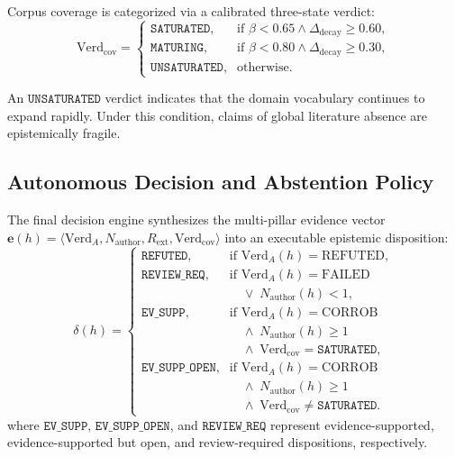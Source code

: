 \documentclass[conference,10pt]{IEEEtran}
\begin{document}
Corpus coverage is categorized via a calibrated three-state verdict:
\begin{equation}
\mathrm{Verd}_{\text{cov}} = \begin{cases}
\texttt{SATURATED}, & \text{if } \beta < 0.65 \land \Delta_{\text{decay}} \ge 0.60, \\
\texttt{MATURING},  & \text{if } \beta < 0.80 \land \Delta_{\text{decay}} \ge 0.30, \\
\texttt{UNSATURATED},& \text{otherwise}.
\end{cases}
\end{equation}

An $\texttt{UNSATURATED}$ verdict indicates that the domain vocabulary continues to expand rapidly. Under this condition, claims of global literature absence are epistemically fragile.

\subsection{Autonomous Decision and Abstention Policy}
The final decision engine synthesizes the multi-pillar evidence vector $\mathbf{e}(h) = \langle \mathrm{Verd}_A, N_{\text{author}}, R_{\text{ext}}, \mathrm{Verd}_{\text{cov}} \rangle$ into an executable epistemic disposition:
\begin{equation}
\delta(h) = \begin{cases}
\texttt{REFUTED}, & \text{if } \mathrm{Verd}_A(h) = \mathrm{REFUTED}, \\
\texttt{REVIEW\_REQ}, & \text{if } \mathrm{Verd}_A(h) = \mathrm{FAILED} \\
                      & \quad \lor \; N_{\text{author}}(h) < 1, \\
\texttt{EV\_SUPP},    & \text{if } \mathrm{Verd}_A(h) = \mathrm{CORROB} \\
                      & \quad \land \; N_{\text{author}}(h) \ge 1 \\
                      & \quad \land \; \mathrm{Verd}_{\text{cov}} = \texttt{SATURATED}, \\
\texttt{EV\_SUPP\_OPEN}, & \text{if } \mathrm{Verd}_A(h) = \mathrm{CORROB} \\
                         & \quad \land \; N_{\text{author}}(h) \ge 1 \\
                         & \quad \land \; \mathrm{Verd}_{\text{cov}} \neq \texttt{SATURATED}.
\end{cases}
\end{equation}
where $\texttt{EV\_SUPP}$, $\texttt{EV\_SUPP\_OPEN}$, and $\texttt{REVIEW\_REQ}$ represent evidence-supported, evidence-supported but open, and review-required dispositions, respectively.
\end{document}

